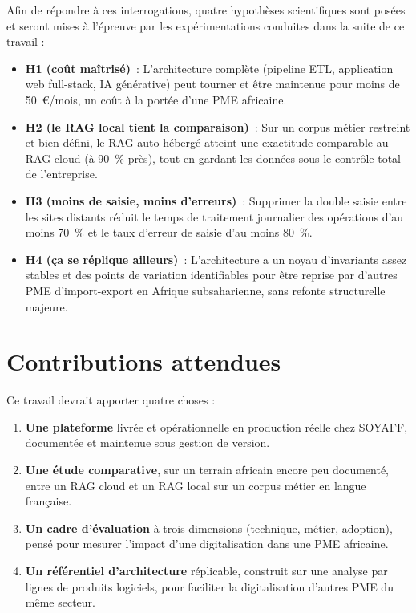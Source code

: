 Afin de répondre à ces interrogations, quatre hypothèses scientifiques sont posées et seront mises à l'épreuve par les expérimentations conduites dans la suite de ce travail :

\begin{itemize}
    \item \textbf{H1 (coût maîtrisé)}~: L'architecture complète (pipeline ETL, application web full-stack, IA générative) peut tourner et être maintenue pour moins de 50~€/mois, un coût à la portée d'une PME africaine.
    \item \textbf{H2 (le RAG local tient la comparaison)}~: Sur un corpus métier restreint et bien défini, le RAG auto-hébergé atteint une exactitude comparable au RAG cloud (à 90~\% près), tout en gardant les données sous le contrôle total de l'entreprise.
    \item \textbf{H3 (moins de saisie, moins d'erreurs)}~: Supprimer la double saisie entre les sites distants réduit le temps de traitement journalier des opérations d'au moins 70~\% et le taux d'erreur de saisie d'au moins 80~\%.
    \item \textbf{H4 (ça se réplique ailleurs)}~: L'architecture a un noyau d'invariants assez stables et des points de variation identifiables pour être reprise par d'autres PME d'import-export en Afrique subsaharienne, sans refonte structurelle majeure.
\end{itemize}

\section*{Contributions attendues}
\label{sec:contributions}

Ce travail devrait apporter quatre choses :
\begin{enumerate}
    \item \textbf{Une plateforme} livrée et opérationnelle en production réelle chez SOYAFF, documentée et maintenue sous gestion de version.
    \item \textbf{Une étude comparative}, sur un terrain africain encore peu documenté, entre un RAG cloud et un RAG local sur un corpus métier en langue française.
    \item \textbf{Un cadre d'évaluation} à trois dimensions (technique, métier, adoption), pensé pour mesurer l'impact d'une digitalisation dans une PME africaine.
    \item \textbf{Un référentiel d'architecture} réplicable, construit sur une analyse par lignes de produits logiciels, pour faciliter la digitalisation d'autres PME du même secteur.
\end{enumerate}

